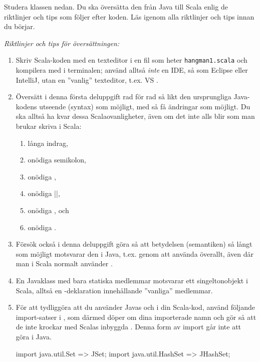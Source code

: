 \Subtask Studera klassen  nedan. Du ska översätta den från Java till Scala enlig de riktlinjer och tips som följer efter koden. Läs igenom alla riktlinjer och tips innan du börjar.


\noindent\emph{Riktlinjer och tips för översättningen:}

\begin{enumerate}[noitemsep]

\item Skriv Scala-koden med en texteditor i en fil som heter \texttt{hangman1.scala} och kompilera med  i terminalen; använd alltså \emph{inte} en IDE, så som Eclipse eller IntelliJ, utan en ''vanlig'' texteditor, t.ex. VS .

\item Översätt i denna första deluppgift rad för rad så likt den ursprungliga Java-kodens utseende (syntax)  som möjligt, med så få ändringar som möjligt. Du ska alltså ha kvar dessa Scalaovanligheter, även om det inte alls blir som man brukar skriva i Scala:
\begin{enumerate}
\item långa indrag, \item onödiga semikolon, \item onödiga \code{()}, \item onödiga \code|{}|, \item onödiga , och \item onödiga .
\end{enumerate}

\item Försök också i denna deluppgift göra så att betydelsen (semantiken) så långt som möjligt motsvarar den i Java, t.ex. genom att använda  överallt, även där man i Scala normalt använder .

\item En Javaklass med bara statiska medlemmar motsvarar ett singeltonobjekt i Scala, alltså en -deklaration innehållande ''vanliga'' medlemmar.

\item För att tydliggöra att du använder Javas  och  i din Scala-kod, använd följande import-satser i , som därmed döper om dina importerade namn och gör så att de inte krockar med Scalas inbyggda . Denna form av import går inte att göra i Java.
\begin{Code}
import java.util.{Set => JSet};
import java.util.{HashSet => JHashSet};
\end{Code}


\end{enumerate}
